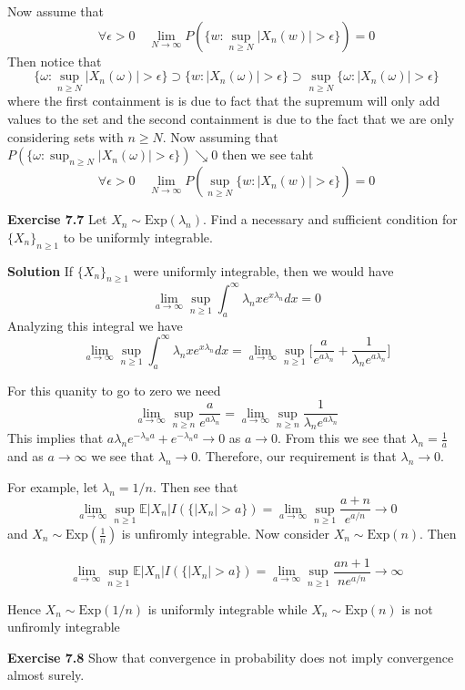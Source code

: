 \documentclass[12pt]{article}  %
\newcommand{\e}{{\epsilon}}
\newcommand{\E}{{\mathbb{E}}}
\begin{document}
Now assume that $$\forall\e>0\hspace{1em} \lim_{N\to\infty}P(\{w:\sup_{n\geq N}|X_n(w)|>\e\})= 0$$ Then notice that $$\{\omega: \sup_{n\geq N}|X_n(\omega)|>\e\}\supset \{w:|X_n(\omega)|>\e\}\supset \sup_{n\geq N}\{\omega: |X_n(\omega)|>\e\}$$ where the first containment is is due to fact that the supremum will only add values to the set and the second containment is due to the fact that we are only considering sets with $n\geq N$. Now assuming that $P(\{\omega: \sup_{n\geq N}|X_n(\omega)|>\e\})\searrow 0$ then we see taht $$\forall\e>0\hspace{1em} \lim_{N\to\infty}P(\sup_{n\geq N}\{w:|X_n(w)|>\e\})= 0$$


\newpage

\textbf{Exercise 7.7} Let $X_n \sim \text{Exp}(\lambda_n)$. Find a necessary and sufficient condition for $\{X_n\}_{n\geq 1}$ to be uniformly integrable.   

\textbf{Solution} If $\{X_n\}_{n\geq1}$ were uniformly integrable, then we would have 
$$\lim_{a\to\infty}\sup_{n\geq 1}\int_a^{\infty}\lambda_n xe^{x\lambda_n}dx = 0 $$ Analyzing this integral we have $$\lim_{a\to\infty}\sup_{n\geq 1}\int_{a}^{\infty}\lambda_nxe^{x\lambda_n}dx = \lim_{a\to\infty}\sup_{n\geq 1}\Big[\frac{a}{e^{a\lambda_n}} + \frac{1}{\lambda_ne^{a\lambda_n}}\Big]$$ 

For this quanity to go to zero we need $$\lim_{a\to\infty}\sup_{n\geq n}\frac{a}{e^{a\lambda_n}} =  \lim_{a\to\infty}\sup_{n\geq n}\frac{1}{\lambda_ne^{a\lambda_n}}$$
This implies that $a\lambda_n e^{-\lambda_n a} + e^{-\lambda_na} \to 0$ as $a\to 0$. From this we see that $\lambda_n = \frac{1}{a}$ and as $a\to\infty$ we see that $\lambda_n \to 0$.  
Therefore, our requirement is that $\lambda_n \to 0$. 

For example, let $\lambda_n = 1/n$. Then see that $$\lim_{a\to\infty}\sup_{n\geq 1} \E|X_n|I(\{|X_n|>a\}) = \lim_{a\to\infty}\sup_{n\geq 1}\frac{a+n}{e^{a/n}} \to 0$$ and $X_n \sim\text{Exp}(\frac{1}{n})$ is unfiromly integrable. Now consider $X_n \sim\text{Exp}(n)$. Then

$$\lim_{a\to\infty}\sup_{n\geq 1} \E|X_n|I(\{|X_n|>a\}) = \lim_{a\to\infty}\sup_{n\geq 1}\frac{an+1}{ne^{a/n}} \to \infty$$


Hence $X_n \sim\text{Exp}(1/n)$ is uniformly integrable while $X_n \sim\text{Exp}(n)$ is not unfiromly integrable


\newpage 

\textbf{Exercise 7.8} Show that convergence in probability does not imply convergence almost surely. 
\end{document}
